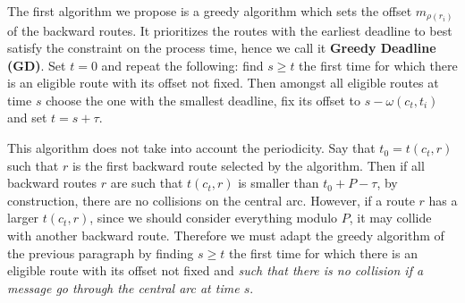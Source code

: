 \documentclass[10pt, conference, letterpaper]{IEEEtran}
\begin{document}
    The first algorithm we propose is a greedy algorithm which sets the offset $m_{\rho(r_i)}$ of the backward routes. It prioritizes the routes with the earliest deadline to best satisfy the
    constraint on the process time, hence we call it \textbf{Greedy Deadline (GD)}. Set $t=0$ and repeat the following: find $s \geq t$ the first time for which there is an eligible route with its offset not fixed. Then amongst all eligible routes at time $s$ choose the one with the smallest deadline, fix its offset to $s - \omega(c_t,t_i) $ and set $t = s + \tau$.
    
    This algorithm does not take into account the periodicity. Say that $t_0 = t(c_t,r)$ such that $r$ is the first backward route selected by the algorithm. Then if all backward routes $r$ are such that $t(c_t,r)$ is smaller than $t_0 + P - \tau$,
    by construction, there are no collisions on the central arc.
    However, if a route $r$ has a larger $t(c_t,r)$, since we should consider everything modulo $P$, 
    it may collide with another backward route. Therefore we must adapt the greedy algorithm of the previous paragraph by finding $s \geq t$ the first time for which there is an eligible route with its offset not fixed and \emph{such that there is no collision if a message go through the central arc at time $s$}. 
    
\end{document}
